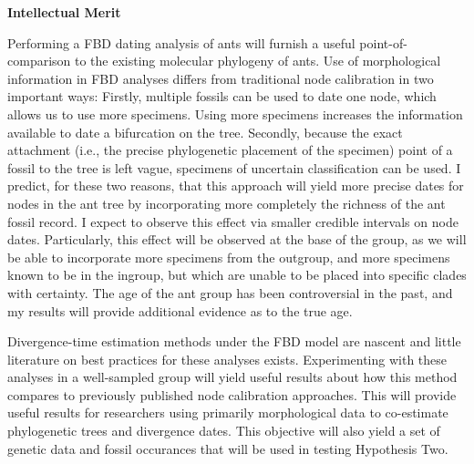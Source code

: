 \documentclass[]{article}
\begin{document}
\textbf{Intellectual Merit} \par
Performing a FBD dating analysis of ants will furnish a useful point-of-comparison to the existing molecular phylogeny of ants.  Use of morphological information in FBD analyses differs from traditional node calibration in two important ways: Firstly, multiple fossils can be used to date one node, which allows us to use more specimens. Using more specimens increases the information available to date a bifurcation on the tree. Secondly, because the exact attachment (i.e., the precise phylogenetic placement of the specimen)  point of a fossil to the tree is left vague, specimens of uncertain classification can be used. I predict, for these two reasons, that this approach will yield more precise dates for nodes in the ant tree by incorporating  more completely the richness of the ant fossil record. I expect to observe this effect via smaller credible intervals on node dates. Particularly, this effect will be observed at the base of the group, as we will be able to incorporate more specimens from the outgroup, and more specimens known to be in the ingroup, but which are unable to be placed into specific clades with certainty. The age of the ant group has been controversial in the past, and my results will provide additional evidence as to the true age. \par
Divergence-time estimation methods under the FBD model are nascent and little literature on best practices for these analyses exists. Experimenting with these analyses in a well-sampled group will yield useful results about how this method compares to previously published node calibration approaches. This will provide useful results for researchers using primarily morphological data to co-estimate phylogenetic trees and divergence dates. This objective will also yield a set of genetic data and fossil occurances that will be used in testing Hypothesis Two. \par
\end{document}

